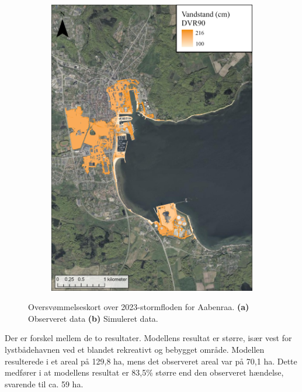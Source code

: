 \begin{figure}[H]
\begin{subfigure}[t]{0.5\textwidth}
        \includegraphics[width=0.95\linewidth]{images/Resultater/2023Model/2023 model_aabenraa.jpg}
        \caption{}
        \label{Subfig: Model Aabenraa}
    \end{subfigure}
    \caption{Oversvømmelseskort over 2023-stormfloden for Aabenraa. \textbf{(a)} Observeret data \textbf{(b)} Simuleret data.}
    \label{Figur: Målt & simuleret Aabenraa}
\end{figure}
Der er forskel mellem de to resultater. Modellens resultat er større, især vest for lystbådehavnen ved et blandet rekreativt og bebygget område. Modellen resulterede i et areal på 129,8 ha, mens det observeret areal var på 70,1 ha. Dette medfører i at modellens resultat er 83,5\% større end den observeret hændelse, svarende til ca. 59 ha.\\

